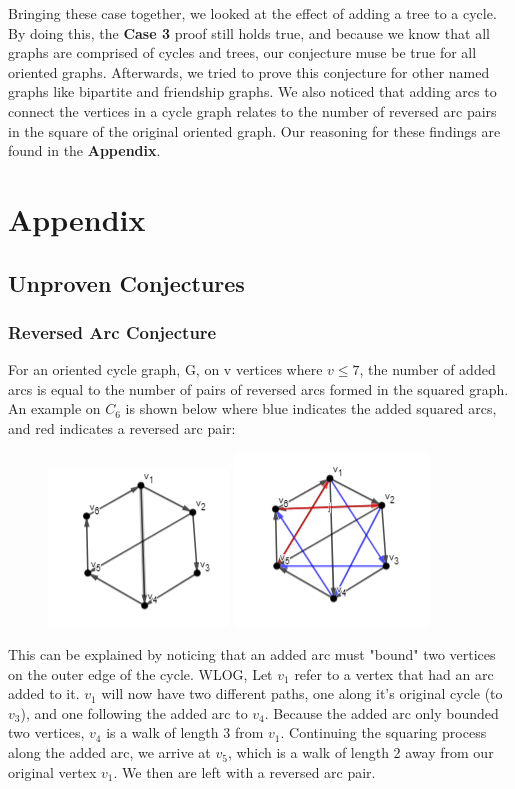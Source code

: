 \documentclass{article}
\begin{document}
Bringing these case together, we looked at the effect of adding a tree to a cycle. By doing this, the \textbf{Case 3} proof still holds true, and because we know that all graphs are comprised of cycles and trees, our conjecture muse be true for all oriented graphs. Afterwards, we tried to prove this conjecture for other named graphs like bipartite and friendship graphs. We also noticed that adding arcs to connect the vertices in a cycle graph relates to the number of reversed arc pairs in the square of the original oriented graph. Our reasoning for these findings are found in the \textbf{Appendix}.

\section{Appendix}
\subsection{Unproven Conjectures}
\subsubsection{Reversed Arc Conjecture} 
For an oriented cycle graph, G, on v vertices where $v\leq 7$, the number of added arcs is equal to the number of pairs of reversed arcs formed in the squared graph. An example on $C_6$ is shown below where blue indicates the added squared arcs, and red indicates a reversed arc pair:
\begin{figure}[ht]
    \includegraphics{c6+2.PNG}
    \includegraphics{c6+2sq.PNG}
\end{figure}
This can be explained by noticing that an added arc must "bound" two vertices on the outer edge of the cycle. WLOG, Let $v_1$ refer to a vertex that had an arc added to it. $v_1$ will now have two different paths, one along it's original cycle (to $v_3$), and one following the added arc to $v_4$.  Because the added arc only bounded two vertices, $v_4$ is a walk of length 3 from $v_1$. Continuing the squaring process along the added arc, we arrive at $v_5$, which is a walk of length 2 away from our original vertex $v_1$. We then are left with a reversed arc pair. 
\end{document}
